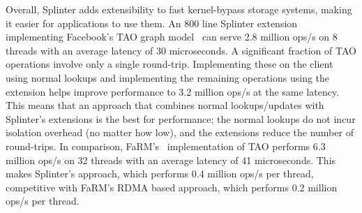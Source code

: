 Overall, Splinter adds extensibility to fast kernel-bypass storage
systems, making it easier for applications to use them.
%
An 800 line Splinter extension implementing Facebook’s TAO graph
model~\cite{tao-2013}
can serve 2.8 million ops/s on 8 threads with an average latency of
30 microseconds.
%
A significant fraction of TAO operations involve only a single
round-trip.
%
Implementing these on the client using normal lookups and
implementing the remaining operations using the extension helps improve
performance to 3.2 million ops/s at the same latency.
%
This means that an
approach that combines normal lookups/updates with Splinter’s extensions
is the best for performance; the normal lookups do not incur isolation
overhead (no matter how low), and the extensions reduce the number of
round-trips.
%
In comparison, FaRM’s~\cite{farm-2014} implementation of TAO performs
6.3 million
ops/s on 32 threads with an average latency of 41 microseconds.
%
This
makes Splinter’s approach, which performs 0.4 million ops/s per thread,
competitive with FaRM’s RDMA based approach, which performs 0.2 million
ops/s per thread.

